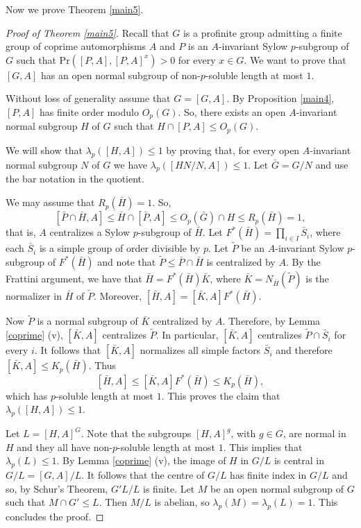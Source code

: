 \documentclass[12pt]{amsart}
\newcommand{\pr }{\mathrm{Pr} }
\begin{document}
Now we prove Theorem \ref{main5}. 

\begin{proof}[Proof of Theorem \ref{main5}] Recall that $G$ is a profinite group admitting a finite group of coprime automorphisms $A$ and $P$ is an $A$-invariant Sylow $p$-subgroup of $G$ such that $\pr([P,A],[P,A]^x)>0$ for every $x\in G$. 
We want to prove that $[G,A]$ has an open normal subgroup of non-$p$-soluble length at most $1$. 

Without loss of generality assume that $G=[G,A]$.  By Proposition \ref{main4},  $[P,A]$ has finite order modulo $O_p(G)$. 
So, there exists an open $A$-invariant normal  subgroup $H$ of $G$ such that $H\cap [P,A]\le O_p(G)$. 

We will show that  $\lambda_p([H,A])\le 1$ by proving that, for every  open $A$-invariant normal subgroup $N$ of $G$  we have  $\lambda_p([HN/N,A])\le 1$. Let $\bar G=G/N$ and use the bar notation in the quotient. 

We may assume that $R_p(\bar H)=1$.
 So, 
\[ [\bar P\cap \bar H, A]\le \bar H\cap [\bar P,A]\le O_p(\bar G) \cap H\le R_p(\bar H)=1,\]
 that is, $A$ centralizes a Sylow $p$-subgroup of $\bar H$. Let $F^*(\bar H)=\prod_{i\in I} \bar S_i$, where each $\bar S_i$ is a simple group of order divisible by $p$. Let $\tilde P$ be an $A$-invariant Sylow $p$-subgroup of $F^*(\bar H)$ and note that $\tilde P \le \bar P\cap \bar H$ is centralized by $A$. 
 By the Frattini argument, we have that $\bar H=F^*(\bar H)\bar K$, where $\bar K=N_{\bar H}(\tilde P)$ is the normalizer in $\bar H$ of $\tilde P$. Moreover, $[\bar H,A]=[\bar K,A]F^*(\bar H)$.

Now $\tilde P$ is a normal subgroup of $\bar K$ centralized by $A$. Therefore, by Lemma \ref{coprime} (v), $[\bar K,A]$ centralizes $\tilde P$. In particular, $[\bar K,A]$ centralizes $\tilde P\cap\bar S_i$ for every $i$.  It follows that $[\bar K,A]$ normalizes all simple factors $\bar S_i$ and therefore $[\bar K,A]\le K_p(\bar H)$. Thus 
\[ [\bar H,A]\le [\bar K,A]F^*(\bar H)\le K_p(\bar H),\]
 which has $p$-soluble length at most $1$. This proves the claim that  $\lambda_p([H,A])\le 1$.

 Let $L=[H,A]^G$. Note that the  subgroups $[H,A]^g$, with $g\in G$, are  normal in $H$ and they all have non-$p$-soluble length at most $1$. This implies that $\lambda_p( L )\le 1$. By Lemma \ref{coprime} (v),   the image of $H$ in $G/L$ is central in $G/L=[G,A]/L$.  It follows that the centre of $G/L$ has finite index in $G/L$ and so, by Schur's Theorem,  
  $G'L/L$ is finite. 
 Let $M$ be an open normal subgroup of $G$ such that $M\cap G'\le L$. Then $M/L$ is abelian,  so $\lambda_p(M)=\lambda_p(L)=1$. This concludes the proof.
 \end{proof}
\end{document}
